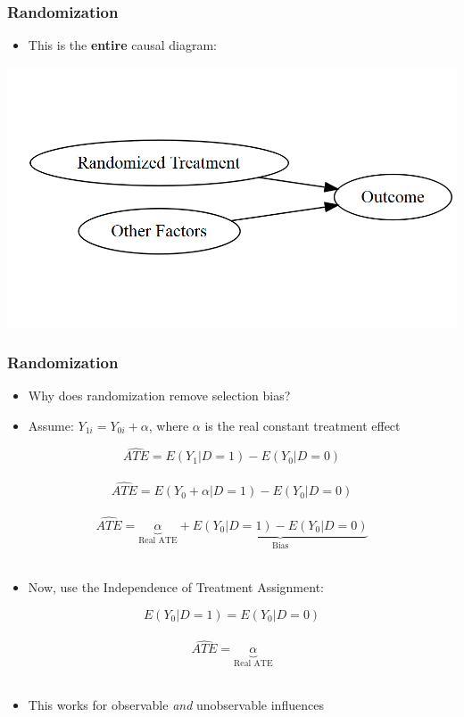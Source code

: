 \documentclass[xcolor=x11names,compress]{beamer}\usepackage[]{graphicx}\usepackage[]{color}
\makeatletter
\def\maxwidth{ %
  \ifdim\Gin@nat@width>\linewidth
    \linewidth
  \else
    \Gin@nat@width
  \fi
}
\newenvironment{knitrout}{}{} %
\renewcommand{\(}{\begin{columns}}
\renewcommand{\)}{\end{columns}}
\newcommand{\<}[1]{\begin{column}{#1}}
\renewcommand{\>}{\end{column}}
\makeatother
\begin{document}
\begin{frame}
\frametitle{Randomization}
\begin{itemize}
\item This is the \textbf{entire} causal diagram:
\end{itemize}
\pause
\begin{knitrout}
\color{fgcolor}
\includegraphics[width=\maxwidth]{figure/explanation1-1} 

\end{knitrout}
\end{frame}

\begin{frame}
\frametitle{Randomization}
\begin{itemize}
\item Why does randomization remove selection bias?
\pause
\item Assume: $Y_{1i} = Y_{0i} + \alpha$, where $\alpha$ is the real constant treatment effect
\pause
\end{itemize}
$$ \hat{ATE} = E(Y_1|D=1) - E(Y_0|D=0)$$ \\ \pause
$$ \hat{ATE} = E(Y_0+\alpha|D=1) - E(Y_0|D=0)$$ \\ \pause
$$ \hat{ATE} = \underbrace{\alpha}_\text{Real ATE} + \underbrace{E(Y_0|D=1) - E(Y_0|D=0)}_\text{Bias}$$ \\
\pause
\begin{itemize}
\item Now, use the Independence of Treatment Assignment:
\end{itemize}
$$ E(Y_0|D=1) = E(Y_0|D=0)$$ \\ \pause
$$ \hat{ATE} = \underbrace{\alpha}_\text{Real ATE} $$ \\
\pause
\begin{itemize}
\item This works for observable \textit{and} unobservable influences
\end{itemize}
\end{frame}
\end{document}
